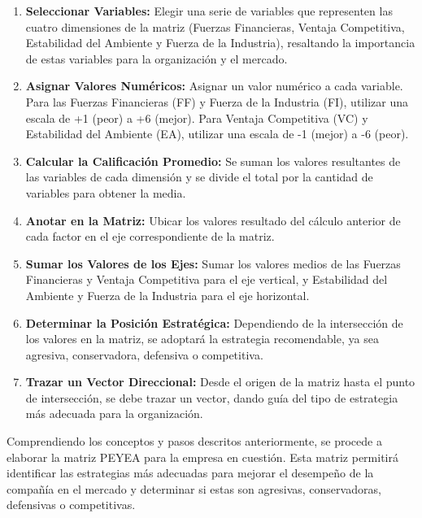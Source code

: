 \begin{enumerate}
    \item \textbf{Seleccionar Variables:} Elegir una serie de variables que representen las cuatro dimensiones de la matriz (Fuerzas Financieras, Ventaja Competitiva, Estabilidad del Ambiente y Fuerza de la Industria), resaltando la importancia de estas variables para la organización y el mercado.
    \item \textbf{Asignar Valores Numéricos:} Asignar un valor numérico a cada variable. Para las Fuerzas Financieras (FF) y Fuerza de la Industria (FI), utilizar una escala de +1 (peor) a +6 (mejor). Para Ventaja Competitiva (VC) y Estabilidad del Ambiente (EA), utilizar una escala de -1 (mejor) a -6 (peor).
    \item \textbf{Calcular la Calificación Promedio:} Se suman los valores resultantes de las variables de cada dimensión y se divide el total por la cantidad de variables para obtener la media.
    \item \textbf{Anotar en la Matriz:} Ubicar los valores resultado del cálculo anterior de cada factor en el eje correspondiente de la matriz.
    \item \textbf{Sumar los Valores de los Ejes:} Sumar los valores medios de las Fuerzas Financieras y Ventaja Competitiva para el eje vertical, y Estabilidad del Ambiente y Fuerza de la Industria para el eje horizontal.
    \item \textbf{Determinar la Posición Estratégica:} Dependiendo de la intersección de los valores en la matriz, se adoptará la estrategia recomendable, ya sea agresiva, conservadora, defensiva o competitiva.
    \item \textbf{Trazar un Vector Direccional:} Desde el origen de la matriz hasta el punto de intersección, se debe trazar un vector, dando guía del tipo de estrategia más adecuada para la organización.
\end{enumerate}

Comprendiendo los conceptos y pasos descritos anteriormente, se procede a elaborar la matriz PEYEA para la empresa en cuestión. Esta matriz permitirá identificar las estrategias más adecuadas para mejorar el desempeño de la compañía en el mercado y determinar si estas son agresivas, conservadoras, defensivas o competitivas.

